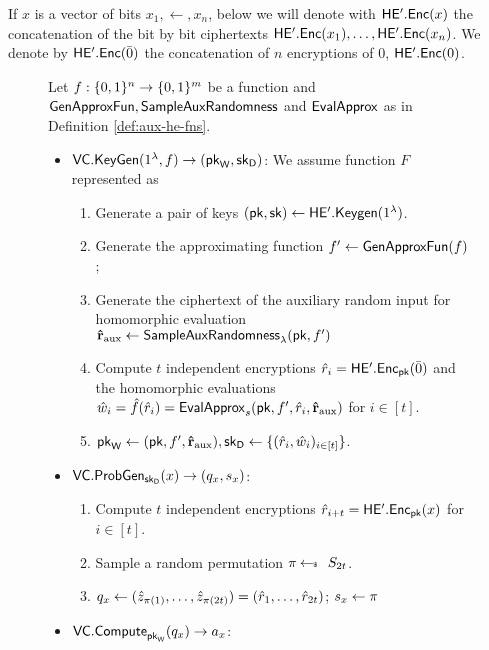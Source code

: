 If $x$ is a vector of bits $x_1, \gets, x_n$, below we will denote with $\mathsf{HE'.Enc}(x)$ the concatenation of the bit by bit ciphertexts $\mathsf{HE'.Enc}(x_1), \dots, \mathsf{HE'.Enc}(x_n)$. We denote by $\mathsf{HE'.Enc}(\bar{0})$ the concatenation of $n$ encryptions of $0$, $\mathsf{HE'.Enc}(0)$.


\begin{figure}
\begin{framed}
Let $f: \{0, 1\}^n \to \{0, 1\}^m$ be a function and $\mathsf{GenApproxFun}, \mathsf{SampleAuxRandomness}$ and $\mathsf{EvalApprox}$ as in Definition \ref{def:aux-he-fns}.
\begin{itemize}
\item $\mathsf{VC.KeyGen}(1^\lambda, f) \rightarrow (\mathsf{pk}_{\mathsf{W}}, \mathsf{sk}_{\mathsf{D}})$: We assume function $F$ represented as 
\begin{enumerate}
\item Generate a pair of keys $(\mathsf{pk},\mathsf{sk}) \gets \mathsf{HE'.Keygen}(1^\lambda)$.
\item Generate the approximating function $f' \gets \mathsf{GenApproxFun}(f)$;
\item Generate the ciphertext of the auxiliary random input for homomorphic evaluation $\mathbf{\hat{r}}_{\text{aux}} \gets \mathsf{SampleAuxRandomness}_{\lambda}(\mathsf{pk}, f')$
\item Compute $t$ independent encryptions $\hat{r}_i = \mathsf{HE'.Enc}_{\mathsf{pk}}(\bar{0})$ and the homomorphic evaluations $\hat{w}_i = \hat{f}(\hat{r}_i) =  \mathsf{EvalApprox}_s(\mathsf{pk}, f', \hat{r}_i, \mathbf{\hat{r}}_{\text{aux}})$ for $i \in [t]$. 
\item $\mathsf{pk}_{\mathsf{W}} \gets (\mathsf{pk}, f', \mathbf{\hat{r}}_{\text{aux}}), \mathsf{sk}_{\mathsf{D}} \gets \{ (\hat{r}_i, \hat{w}_i)_{i \in [t]}\}$.
\end{enumerate}
\item $\mathsf{VC.ProbGen}_{\mathsf{sk}_{\mathsf{D}}}(x) \rightarrow (q_x, s_x)$: 
\begin{enumerate}
\item Compute $t$ independent encryptions $\hat{r}_{i+t} = \mathsf{HE'.Enc}_{\mathsf{pk}}(x)$ for $i \in [t]$.
\item Sample a random permutation $\pi \sample S_{2t}$.
\item $q_x \gets (\hat{z}_{\pi(1)},\dots,\hat{z}_{\pi(2t)}) = (\hat{r}_1,\dots,\hat{r}_{2t})$; $s_x \gets \pi$
\end{enumerate}
\item $\mathsf{VC.Compute}_{\mathsf{pk}_{\mathsf{W}}}(q_x) \rightarrow a_x$:

\end{itemize}
\end{framed}
\end{figure}
